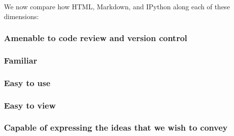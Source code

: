 \documentclass[]{article}
\begin{document}
We now compare how HTML, Markdown, and IPython along each of these dimensions:

	\subsubsection{Amenable to code review and version control}
	
		
	
	\subsubsection{Familiar}
	
	\subsubsection{Easy to use}
	
	\subsubsection{Easy to view}
	
	\subsubsection{Capable of expressing the ideas that we wish to convey}
\end{document}
